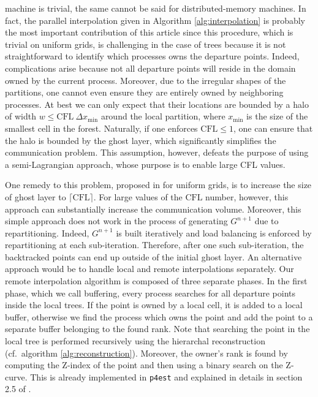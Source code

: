 machine is trivial, the same cannot be said for distributed-memory machines.
In fact, the parallel interpolation given in Algorithm \ref{alg:interpolation}
is probably the most important contribution of this article since this
procedure, which is trivial on uniform grids, is challenging in the case of
trees because it is not straightforward to identify which processes owns the
departure points.
Indeed, complications arise because not all departure points will reside in the
domain owned by the current process. Moreover, due to the irregular shapes of
the partitions, one cannot even ensure they are entirely owned by neighboring
processes.
At best we can only expect that their locations are bounded by a halo of width
$w \le \text{CFL} \: \Delta x_{\min}$ around the local partition, where
$x_{\min}$ is the size of the smallest cell in the forest.
Naturally, if one enforces $\text{CFL} \le 1$, one can ensure that the halo is
bounded by the ghost layer, which significantly simplifies the communication
problem.
This assumption, however, defeats the purpose of using a semi-Lagrangian
approach, whose purpose is to enable large CFL values.

One remedy to this problem, proposed in \cite{Thomas;Cote:95:Massively-parallel-s} for uniform grids, is to increase the size of ghost layer to $\lceil \text{CFL} \rceil$. For large values of the $\text{CFL}$ number, however, this approach can substantially increase the communication volume. Moreover, this simple approach does not work in the process of generating $G^{n+1}$ due to repartitioning. Indeed, $G^{n+1}$ is built iteratively and load balancing is enforced by repartitioning at each sub-iteration. Therefore, after one such sub-iteration, the backtracked points can end up outside of the initial ghost layer. An alternative approach would be to handle local and remote interpolations separately. Our remote interpolation algorithm is composed of three separate phases. In the first phase, which we call buffering, every process searches for all departure points inside the local trees. If the point is owned by a local cell, it is added to a local buffer, otherwise we find the process which owns the point and add the point to a separate buffer belonging to the found rank. Note that searching the point in the local tree is performed recursively using the hierarchal reconstruction (cf.\ algorithm \ref{alg:reconstruction}). Moreover, the owner's rank is found by computing the Z-index of the point and then using a binary search on the Z-curve. This is already implemented in \texttt{p4est} and explained in details in section 2.5 of \cite{Burstedde;Wilcox;Ghattas:11:p4est:-Scalable-Algo}.

